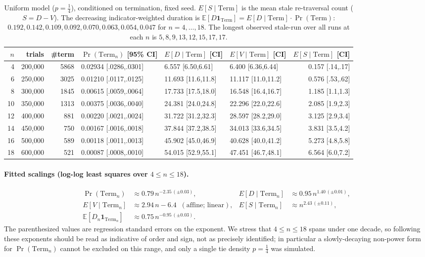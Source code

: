 \documentclass[11pt]{article}
\theoremstyle{definition}
\theoremstyle{remark}
\newcommand{\Term}{\mathrm{Term}}
\newcommand{\E}{\mathbb{E}}
\begin{document}
\begin{table}[t]
\centering
\footnotesize
\setlength{\tabcolsep}{4pt}
\begin{tabular}{rrrlllr}
\toprule
$n$ & trials & \#term & $\Pr(\Term_n)$ [95\% CI] & $E[D \mid \Term]$ [CI] & $E[V \mid \Term]$ [CI] & $E[S \mid \Term]$ [CI]\\
\midrule
4  & 200{,}000 & 5868 & 0.02934 [.0286,.0301] & 6.557 [6.50,6.61]  & 6.400 [6.36,6.44]  & 0.157 [.14,.17]\\
6  & 250{,}000 & 3025 & 0.01210 [.0117,.0125] & 11.693 [11.6,11.8] & 11.117 [11.0,11.2] & 0.576 [.53,.62]\\
8  & 300{,}000 & 1845 & 0.00615 [.0059,.0064] & 17.733 [17.5,18.0] & 16.548 [16.4,16.7] & 1.185 [1.1,1.3]\\
10 & 350{,}000 & 1313 & 0.00375 [.0036,.0040] & 24.381 [24.0,24.8] & 22.296 [22.0,22.6] & 2.085 [1.9,2.3]\\
12 & 400{,}000 & 881  & 0.00220 [.0021,.0024] & 31.722 [31.2,32.3] & 28.597 [28.2,29.0] & 3.125 [2.9,3.4]\\
14 & 450{,}000 & 750  & 0.00167 [.0016,.0018] & 37.844 [37.2,38.5] & 34.013 [33.6,34.5] & 3.831 [3.5,4.2]\\
16 & 500{,}000 & 589  & 0.00118 [.0011,.0013] & 45.902 [45.0,46.9] & 40.628 [40.0,41.2] & 5.273 [4.8,5.8]\\
18 & 600{,}000 & 521  & 0.00087 [.0008,.0010] & 54.015 [52.9,55.1] & 47.451 [46.7,48.1] & 6.564 [6.0,7.2]\\
\bottomrule
\end{tabular}
\caption{Uniform model ($p = \tfrac14$), conditioned on termination, fixed seed. $E[S \mid \Term]$ is the mean stale
re-traversal count ($S = D - V$). The decreasing indicator-weighted duration is $\E[D \mathbf 1_{\Term}] = E[D \mid \Term]
\cdot \Pr(\Term)$: $0.192, 0.142, 0.109, 0.092, 0.070, 0.063, 0.054, 0.047$ for $n = 4, \dots, 18$. The longest observed
stale-run over all runs at each $n$ is $5, 8, 9, 13, 12, 15, 17, 17$.}
\label{tab:sim}
\end{table}

\paragraph{Fitted scalings (log-log least squares over $4 \le n \le 18$).}
\begin{align*}
\Pr(\Term_n) &\approx 0.79\, n^{-2.35\,(\pm 0.03)}, &
E[D \mid \Term_n] &\approx 0.95\, n^{1.40\,(\pm 0.01)},\\
E[V \mid \Term_n] &\approx 2.94\, n - 6.4 \;\;(\text{affine; linear}), &
E[S \mid \Term_n] &\approx n^{2.43\,(\pm 0.11)},\\
\E[D_n \mathbf 1_{\Term_n}] &\approx 0.75\, n^{-0.95\,(\pm 0.03)}. & &
\end{align*}
The parenthesized values are regression standard errors on the exponent. We stress that $4 \le n \le 18$ spans under one
decade, so following~\cite{Clauset} these exponents should be read as indicative of order and sign, not as precisely
identified; in particular a slowly-decaying non-power form for $\Pr(\Term_n)$ cannot be excluded on this range, and only a
single tie density $p = \tfrac14$ was simulated.
\end{document}
